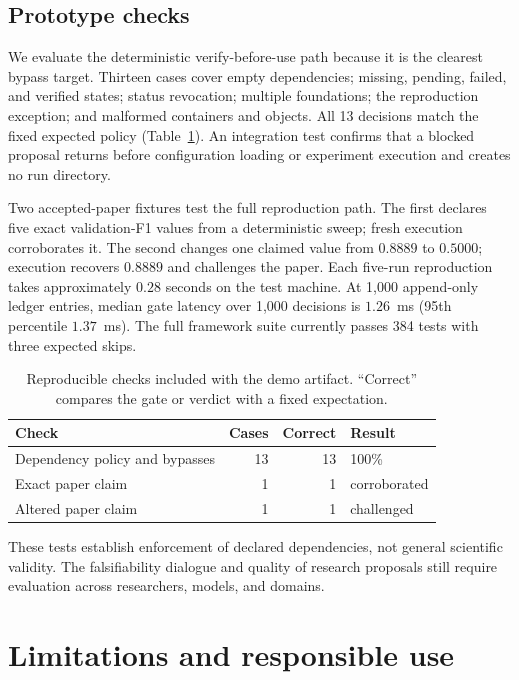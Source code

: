 \documentclass{article}
\begin{document}
\subsection{Prototype checks}

We evaluate the deterministic verify-before-use path because it is the clearest bypass target. Thirteen cases cover empty dependencies; missing, pending, failed, and verified states; status revocation; multiple foundations; the reproduction exception; and malformed containers and objects. All 13 decisions match the fixed expected policy (Table~\ref{tab:results}). An integration test confirms that a blocked proposal returns before configuration loading or experiment execution and creates no run directory.

Two accepted-paper fixtures test the full reproduction path. The first declares five exact validation-F1 values from a deterministic sweep; fresh execution corroborates it. The second changes one claimed value from $0.8889$ to $0.5000$; execution recovers $0.8889$ and challenges the paper. Each five-run reproduction takes approximately $0.28$ seconds on the test machine. At 1,000 append-only ledger entries, median gate latency over 1,000 decisions is $1.26$~ms (95th percentile $1.37$~ms). The full framework suite currently passes 384 tests with three expected skips.

\begin{table}[h]
  \caption{Reproducible checks included with the demo artifact. ``Correct'' compares the gate or verdict with a fixed expectation.}
  \label{tab:results}
  \centering
  \small
  \begin{tabular}{lrrl}
    \toprule
    Check & Cases & Correct & Result \\
    \midrule
    Dependency policy and bypasses & 13 & 13 & 100\% \\
    Exact paper claim & 1 & 1 & corroborated \\
    Altered paper claim & 1 & 1 & challenged \\
    \bottomrule
  \end{tabular}
\end{table}

These tests establish enforcement of declared dependencies, not general scientific validity. The falsifiability dialogue and quality of research proposals still require evaluation across researchers, models, and domains.

\section{Limitations and responsible use}
\end{document}
